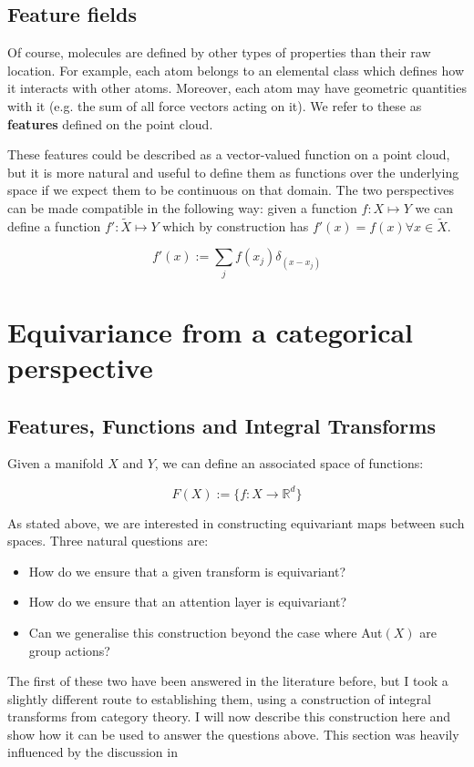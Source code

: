 \documentclass[11pt]{article}
\begin{document}
\subsection{Feature fields}
Of course, molecules are defined by other types of properties than their raw location. For example, each atom belongs to an elemental class which defines how it interacts with other atoms. Moreover, each atom may have geometric quantities with it (e.g. the sum of all force vectors acting on it). We refer to these as \textbf{features} defined on the point cloud.

These features could be described as a vector-valued function on a point cloud, but it is more natural and useful to define them as functions over the underlying space if we expect them to be continuous on that domain. The two perspectives can be made compatible in the following way: given a function $f: X \mapsto Y$ we can define a function $f': \tilde{X} \mapsto Y$ which by construction has $f'(x) = f(x) \forall x \in \tilde{X}$.

$$ f'(x) := \sum_j f(x_j)\delta_(x - x_j)$$

\section{Equivariance from a categorical perspective}

\subsection*{Features, Functions and Integral Transforms}

Given a manifold $X$ and $Y$, we can define an associated space of functions:

$$ F(X) := \{ f: X \rightarrow \mathbb{R}^d \}$$

As stated above, we are interested in constructing equivariant maps between such spaces. Three natural questions are:

\begin{itemize}
    \item How do we ensure that a given transform is equivariant?
    \item How do we ensure that an attention layer is equivariant?
    \item Can we generalise this construction beyond the case where Aut$(X)$ are group actions?
\end{itemize}

The first of these two have been answered in the literature before, but I took a slightly different route to establishing them, using a construction of integral transforms from category theory. I will now describe this construction here and show how it can be used to answer the questions above. This section was heavily influenced by the discussion in \cite{integral_transforms}
\end{document}
